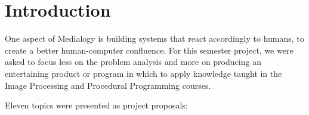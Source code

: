 \chapter{Introduction}
One aspect of Medialogy is building systems that react accordingly to humans, to create a better human-computer confluence. For this semester project, we were asked to focus less on the problem analysis and more on producing an entertaining product or program in which to apply knowledge taught in the Image Processing and Procedural Programming courses.






Eleven topics were presented as project proposals:

